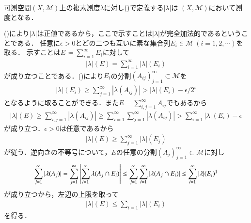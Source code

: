 	\begin{itembox}[l]{}
		\begin{thm}
			可測空間$(X,\mathcal{M})$上の複素測度$\lambda$に対し()で定義する$|\lambda|$は
			$(X,\mathcal{M})$において測度となる．
		\end{thm}
	\end{itembox}
	
	\begin{prf}
		()により$|\lambda|$は正値であるから，ここで示すことは$|\lambda|$が完全加法的であるということである．
		任意に$\epsilon > 0$とどの二つも互いに素な集合列$E_i \in \mathcal{M}\ (i=1,2,\cdots)$を取る．
		示すことは$E \coloneqq \sum_{i=1}^{\infty} E_i$に対して
		\begin{align}
			|\lambda|(E) = \sum_{i=1}^{\infty} |\lambda|(E_i)
		\end{align}
		が成り立つことである．()により$E_i$の分割$(A_{ij})_{j=1}^{\infty} \subset \mathcal{M}$を
		\begin{align}
			|\lambda|(E_i) \geq \sum_{j=1}^{\infty} |\lambda(A_{ij})| > |\lambda|(E_i) - \epsilon/2^i
		\end{align}
		となるように取ることができる．また$E = \sum_{i,j=1}^{\infty} A_{ij}$でもあるから
		\begin{align}
			|\lambda|(E) \geq \sum_{i,j=1}^{\infty} |\lambda(A_{ij})| \geq \sum_{i=1}^{\infty}\sum_{j=1}^{\infty} |\lambda(A_{ij})| > \sum_{i=1}^{\infty} |\lambda|(E_i) - \epsilon
		\end{align}
		が成り立つ．$\epsilon > 0$は任意であるから
		\begin{align}
			|\lambda|(E) \geq \sum_{j=1}^{\infty} |\lambda|(E_j)
		\end{align}
		が従う．逆向きの不等号について，$E$の任意の分割$(A_j)_{j=1}^{\infty} \subset \mathcal{M}$に対し
		\begin{align}
			\sum_{j=1}^{\infty} |\lambda(A_j)| 
			= \sum_{j=1}^{\infty} \left| \sum_{i=1}^{\infty} \lambda(A_j \cap E_i) \right|
			\leq \sum_{j=1}^{\infty} \sum_{i=1}^{\infty} |\lambda(A_j \cap E_i)|
			\leq \sum_{i=1}^{\infty} |\lambda|(E_i)
			\footnotemark
		\end{align}
		が成り立つから，左辺の上限を取って
		\begin{align}
			|\lambda|(E) \leq \sum_{i=1} |\lambda|(E_i)
		\end{align}
		を得る．
		\QED
	\end{prf}
	
